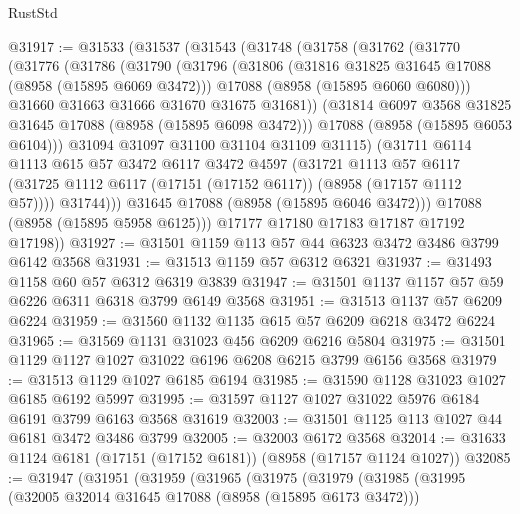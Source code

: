 \begin{lexlean}{RustStd}
\begin{coremodule}
@31917 := @31533
    (@31537
      (@31543
        (@31748
          (@31758
            (@31762
              (@31770
                (@31776
                  (@31786
                    (@31790
                      (@31796
                        (@31806
                          (@31816 @31825 @31645 @17088 (@8958 (@15895 @6069 @3472)))
                          @17088
                          (@8958 (@15895 @6060 @6080)))
                        @31660
                        @31663
                        @31666
                        @31670
                        @31675
                        @31681))
                    (@31814 @6097 @3568 @31825 @31645 @17088 (@8958 (@15895 @6098 @3472)))
                    @17088
                    (@8958 (@15895 @6053 @6104)))
                  @31094
                  @31097
                  @31100
                  @31104
                  @31109
                  @31115)
                (@31711
                  @6114
                  @1113
                  @615
                  @57
                  @3472
                  @6117
                  @3472
                  @4597
                  (@31721
                    @1113
                    @57
                    @6117
                    (@31725 @1112 @6117 (@17151 (@17152 @6117)) (@8958 (@17157 @1112 @57))))
                  @31744)))
            @31645
            @17088
            (@8958 (@15895 @6046 @3472)))
          @17088
          (@8958 (@15895 @5958 @6125)))
        @17177
        @17180
        @17183
        @17187
        @17192
        @17198))
@31927 := @31501 @1159 @113 @57 @44 @6323 @3472 @3486 @3799 @6142 @3568
@31931 := @31513 @1159 @57 @6312 @6321
@31937 := @31493 @1158 @60 @57 @6312 @6319 @3839
@31947 := @31501 @1137 @1157 @57 @59 @6226 @6311 @6318 @3799 @6149 @3568
@31951 := @31513 @1137 @57 @6209 @6224
@31959 := @31560 @1132 @1135 @615 @57 @6209 @6218 @3472 @6224
@31965 := @31569 @1131 @31023 @456 @6209 @6216 @5804
@31975 := @31501 @1129 @1127 @1027 @31022 @6196 @6208 @6215 @3799 @6156 @3568
@31979 := @31513 @1129 @1027 @6185 @6194
@31985 := @31590 @1128 @31023 @1027 @6185 @6192 @5997
@31995 := @31597 @1127 @1027 @31022 @5976 @6184 @6191 @3799 @6163 @3568 @31619
@32003 := @31501 @1125 @113 @1027 @44 @6181 @3472 @3486 @3799
@32005 := @32003 @6172 @3568
@32014 := @31633 @1124 @6181 (@17151 (@17152 @6181)) (@8958 (@17157 @1124 @1027))
@32085 := @31947
    (@31951
      (@31959
        (@31965
          (@31975
            (@31979
              (@31985
                (@31995
                  (@32005 @32014 @31645 @17088 (@8958 (@15895 @6173 @3472)))

\end{coremodule}
\end{lexlean}
